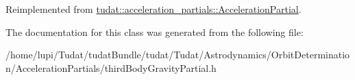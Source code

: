 Reimplemented from \hyperlink{classtudat_1_1acceleration__partials_1_1AccelerationPartial_a1566f99b2cfd42d523c06ee6c1559435}{tudat\+::acceleration\+\_\+partials\+::\+Acceleration\+Partial}.



The documentation for this class was generated from the following file\+:\begin{DoxyCompactItemize}
\item 
/home/lupi/\+Tudat/tudat\+Bundle/tudat/\+Tudat/\+Astrodynamics/\+Orbit\+Determination/\+Acceleration\+Partials/third\+Body\+Gravity\+Partial.\+h\end{DoxyCompactItemize}
